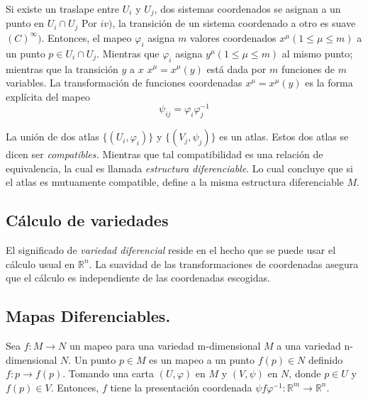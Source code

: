 \documentclass{report}
\begin{document}
Si existe un traslape entre $U_{i}$ y $U_{j}$, dos sistemas coordenados se asignan a un punto en $U_{i} \cap U_{j}$ Por $iv)$, la transición de un sistema coordenado a otro es suave $(C)^{\infty})$. Entonces, el mapeo $\varphi _{i}$ asigna $m$ valores coordenados $ x^{\mu }(1 \leq \mu \leq m)$ a un punto $p \in U_{i} \cap U_{j}$. Mientras que $\varphi _{i}$ asigna $y^{\mu}(1 \leq \mu \leq m)$ al mismo punto; mientras que la transición $y$ a $x$ $x ^{\mu} =x^{\mu}(y)$ está dada por $m$ funciones de $m$ variables. La transformación de funciones coordenadas $x^{\mu} = x^{\mu} (y)$ es la forma explícita del mapeo\\

\begin{equation}
\psi _{ij} = \varphi _{i} \varphi _{j}^{-1}
\end{equation}

La unión de dos atlas $\lbrace (U_{i}, \varphi _{i}) \rbrace$ y $\lbrace (V_{j}, \psi _{j}) \rbrace$ es un atlas. Estos dos atlas se dicen ser \textit{compatibles.} Mientras que tal compatibilidad es una relación de equivalencia, la cual es llamada \textit{estructura diferenciable}. Lo cual concluye que si el atlas es mutuamente compatible, define a la misma estructura diferenciable $M$.\\

\subsection{Cálculo de variedades}

El significado de \textit{variedad diferencial} reside en el hecho que se puede usar el cálculo usual en $\mathbb{R}^{n}$. La suavidad de las transformaciones de coordenadas asegura que el cálculo es independiente de las coordenadas escogidas.\\

\subsection{Mapas Diferenciables.}

Sea $f: M \rightarrow N$ un mapeo para una variedad m-dimensional $M$ a una variedad n-dimensional $N$. Un punto $p \in M$ es un mapeo a un punto $f (p) \in N$ definido $f : p\rightarrow f(p)$. Tomando una carta $(U, \varphi)$ en $M$ y $(V, \psi)$ en $N$, donde $p \in U$ y $f (p) \in V$. Entonces, $f$ tiene la presentación coordenada $\psi f \varphi ^{-1} : \mathbb{R}^{m} \rightarrow \mathbb{R}^{n}$.\\
\end{document}
